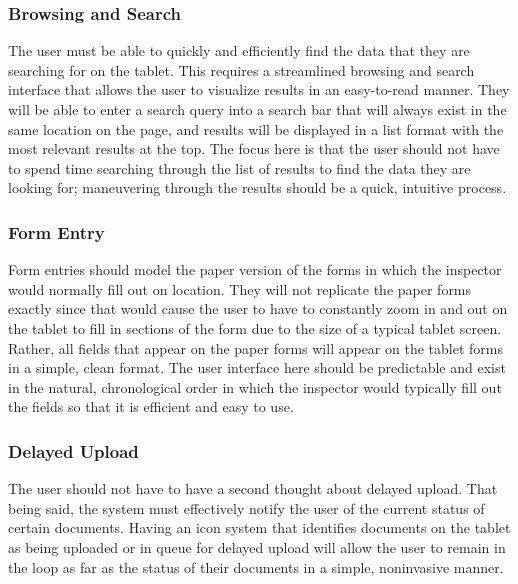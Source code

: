 \documentclass[twoside,letterpaper]{article}
\begin{document}
\subsubsection[Browsing and Search]{\rmfamily\bfseries\color{black}
Browsing and Search}
{\rmfamily\color{black}
The user must be able to quickly and efficiently find the data that they are searching for on the tablet. This requires a streamlined browsing and search interface that allows the user to visualize results in an easy-to-read manner. They will be able to enter a search query into a search bar that will always exist in the same location on the page, and results will be displayed in a list format with the most relevant results at the top. The focus here is that the user should not have to spend time searching through the list of results to find the data they are looking for; maneuvering through the results should be a quick, intuitive process.  
}
\subsubsection[Form Entry]{\rmfamily\bfseries\color{black}
Form Entry}
{\rmfamily\color{black}
Form entries should model the paper version of the forms in which the inspector would normally fill out on location. They will not replicate the paper forms exactly since that would cause the user to have to constantly zoom in and out on the tablet to fill in sections of the form due to the size of a typical tablet screen. Rather, all fields that appear on the paper forms will appear on the tablet forms in a simple, clean format. The user interface here should be predictable and exist in the natural, chronological order in which the inspector would typically fill out the fields so that it is efficient and easy to use. 
}
\subsubsection[Delayed Upload]{\rmfamily\bfseries\color{black}
Delayed Upload}
{\rmfamily\color{black}
The user should not have to have a second thought about delayed upload. That being said, the system must effectively notify the user of the current status of certain documents. Having an icon system that identifies documents on the tablet as being uploaded or in queue for delayed upload will allow the user to remain in the loop as far as the status of their documents in a simple, noninvasive manner.
}
\end{document}
